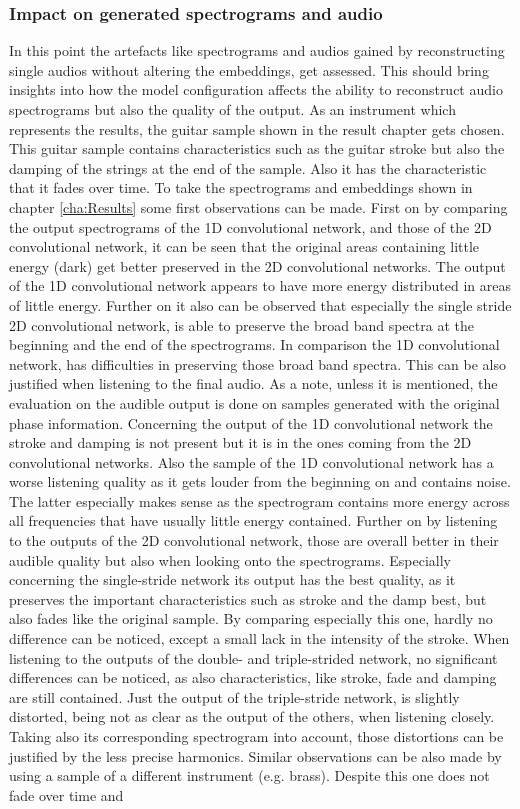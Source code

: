 \subsubsection{Impact on generated spectrograms and audio}
In this point the artefacts like spectrograms and audios gained by reconstructing single audios without altering the embeddings, get assessed. This should bring insights into how the model configuration affects the ability to reconstruct audio spectrograms but also the quality of the output. As an instrument which represents the results, the guitar sample shown in the result chapter gets chosen. This guitar sample contains characteristics such as the guitar stroke but also the damping of the strings at the end of the sample. Also it has the characteristic that it fades over time. To take the spectrograms and embeddings shown in chapter \ref{cha:Results} some first observations can be made. First on by comparing the output spectrograms of the 1D convolutional network, and those of the 2D convolutional network, it can be seen that the original areas containing little energy (dark) get better preserved in the 2D convolutional networks. The output of the 1D convolutional network appears to have more energy distributed in areas of little energy. Further on it also can be observed that especially the single stride 2D convolutional network, is able to preserve the broad band spectra at the beginning and the end of the spectrograms. In comparison the 1D convolutional network, has difficulties in preserving those broad band spectra. This can be also justified when listening to the final audio. As a note, unless it is mentioned, the evaluation on the audible output is done on samples generated with the original phase information. Concerning the output of the 1D convolutional network the stroke and damping is not present but it is in the ones coming from the 2D convolutional networks. Also the sample of the 1D convolutional network has a worse listening quality as it gets louder from the beginning on and contains noise. The latter especially makes sense as the spectrogram contains more energy across all frequencies that have usually little energy contained. Further on by listening to the outputs of the 2D convolutional network, those are overall better in their audible quality but also when looking onto the spectrograms. Especially concerning the single-stride network its output has the best quality, as it preserves the important characteristics such as stroke and the damp best, but also fades like the original sample. By comparing especially this one, hardly no difference can be noticed, except a small lack in the intensity of the stroke. When listening to the outputs of the double- and triple-strided network, no significant differences can be noticed, as also characteristics, like stroke, fade and damping are still contained. Just the output of the triple-stride network, is slightly distorted, being not as clear as the output of the others, when listening closely. Taking also its corresponding spectrogram into account, those distortions can be justified by the less precise harmonics. Similar observations can be also made by using a sample of a different instrument (e.g. brass). Despite this one does not fade over time and 